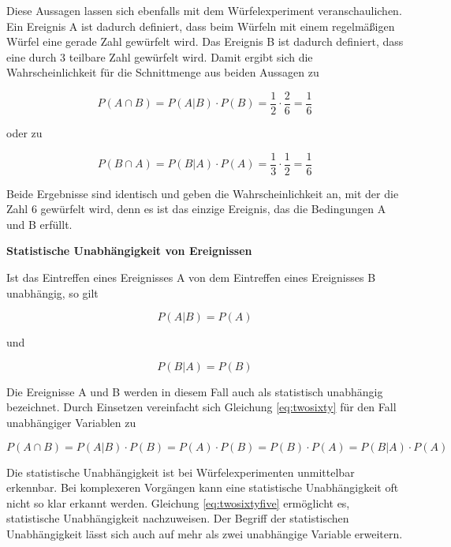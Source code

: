 \noindent Diese Aussagen lassen sich ebenfalls mit dem W\"{u}rfelexperiment veranschaulichen. Ein Ereignis A ist dadurch definiert, dass beim W\"{u}rfeln mit einem regelm\"{a}{\ss}igen W\"{u}rfel eine gerade Zahl gew\"{u}rfelt wird. Das Ereignis B ist dadurch definiert, dass eine durch 3 teilbare Zahl gew\"{u}rfelt wird. Damit ergibt sich die Wahrscheinlichkeit f\"{u}r die Schnittmenge aus beiden Aussagen zu 

\begin{equation}\label{eq:twosixtyone}
P(A\cap B)=P(A|B)\cdot P(B)=\dfrac{1}{2} \cdot \dfrac{2}{6} =\dfrac{1}{6}
\end{equation}

\noindent oder zu 

\begin{equation}\label{eq:twosixtytwo}
P(B\cap A)=P(B|A)\cdot P(A)=\dfrac{1}{3} \cdot \dfrac{1}{2} =\dfrac{1}{6}
\end{equation}

\noindent Beide Ergebnisse sind identisch und geben die Wahrscheinlichkeit an, mit der die Zahl 6 gew\"{u}rfelt wird, denn es ist das einzige Ereignis, das die Bedingungen A und B erf\"{u}llt.\bigskip

{\selectfont
\noindent\textbf{Statistische Unabhängigkeit von Ereignissen}} \smallskip

\noindent Ist das Eintreffen eines Ereignisses A von dem Eintreffen eines Ereignisses B unabh\"{a}ngig, so gilt

\begin{equation}\label{eq:twosixtythree}
P(A|B)=P(A)
\end{equation}

\noindent und

\begin{equation}\label{eq:twosixtyfour}
P(B|A)=P(B)
\end{equation}

\noindent Die Ereignisse A und B werden in diesem Fall auch als statistisch unabh\"{a}ngig bezeichnet. Durch Einsetzen vereinfacht sich Gleichung \eqref{eq:twosixty} f\"{u}r den Fall unabh\"{a}ngiger Variablen zu 

\begin{equation}\label{eq:twosixtyfive}
P(A\cap B)=P(A|B)\cdot P(B)=P(A)\cdot P(B)=P(B)\cdot P(A)=P(B|A)\cdot P(A)
\end{equation}

\noindent Die statistische Unabh\"{a}ngigkeit ist bei W\"{u}rfelexperimenten unmittelbar erkennbar. Bei komplexeren Vorg\"{a}ngen kann eine statistische Unabh\"{a}ngigkeit oft nicht so klar erkannt werden. Gleichung \eqref{eq:twosixtyfive} erm\"{o}glicht es, statistische Unabh\"{a}ngigkeit nachzuweisen. Der Begriff der statistischen Unabh\"{a}ngigkeit l\"{a}sst sich auch auf mehr als zwei unabh\"{a}ngige Variable erweitern.

